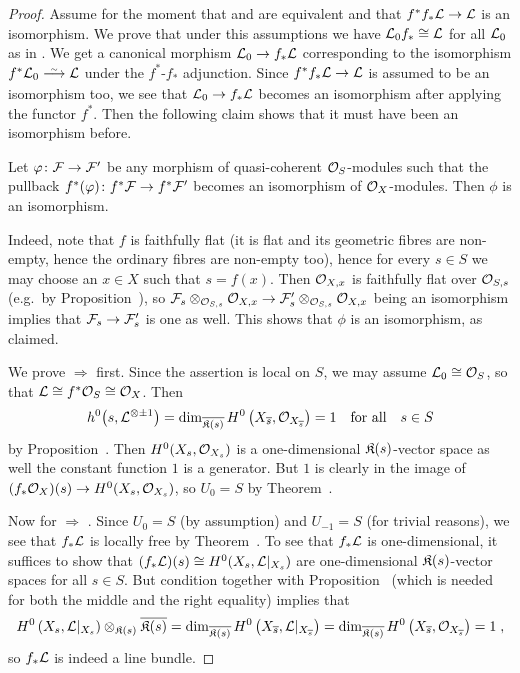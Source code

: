 \documentclass[a4paper,parskip=half,numbers=enddot, DIV=12]{scrreprt}
\begin{document}
\begin{proof}
	Assume for the moment that  and  are equivalent and that $f^*f_*\Ll\morphism \Ll$ is an isomorphism. We prove that under this assumptions we have $\mathcal{L}_0f_*\cong \mathcal{L}$ for all $\mathcal{L}_0$ as in . We get a canonical morphism $\Ll_0\morphism f_*\Ll$ corresponding to the isomorphism $f^*\Ll_0\isomorphism \Ll$ under the $f^*$-$f_*$ adjunction. Since $f^*f_*\Ll\morphism\Ll$ is assumed to be an isomorphism too, we see that $\Ll_0\morphism f_*\Ll$ becomes an isomorphism after applying the functor $f^*$. Then the following claim shows that it must have been an isomorphism before.
	\begin{claim}
		Let $\phi\colon \Ff\morphism\Ff'$ be any morphism of quasi-coherent $\mathcal{O}_S$-modules such that the pullback $f^*(\phi)\colon f^*\Ff\morphism  f^*\Ff'$ becomes an isomorphism of $\mathcal{O}_X$-modules. Then $\phi$ is an isomorphism.
	\end{claim}
	Indeed, note that $f$ is faithfully flat (it is flat and its geometric fibres are non-empty, hence the ordinary fibres are non-empty too), hence for every $s\in S$ we may choose an $x\in X$ such that $s=f(x)$. Then $\mathcal{O}_{X,x}$ is faithfully flat over $\mathcal{O}_{S,s}$ (e.g.\ by Proposition~), so $\Ff_s\otimes_{\Oo_{S,s}}\Oo_{X,x}\morphism\Ff'_s\otimes_{\Oo_{S,s}}\Oo_{X,x}$ being an isomorphism implies that $\Ff_s \morphism\Ff'_s$ is one as well. This shows that $\phi$ is an isomorphism, as claimed.
	
	We prove  $\Rightarrow$  first. Since the assertion is local on $S$, we may assume $\mathcal{L}_0\cong\mathcal{O}_S$, so that $\mathcal{L}\cong f^*\mathcal{O}_S\cong \mathcal{O}_X$. Then
	\begin{align*}
		h^0\big(s,\mathcal{L}^{\otimes \pm 1}\big)=\dim_{\overline{\mathfrak{K}(s)}}H^0\left(X_{\overline{s}},\mathcal{O}_{X_{\overline{s}}}\right)=1\quad\text{for all}\quad s\in S 
	\end{align*}
	by Proposition~. Then $H^0(X_s,\mathcal{O}_{X_s})$ is a one-dimensional $\mathfrak{K}(s)$-vector space as well the constant function $1$ is a generator. But $1$ is clearly in the image of $(f_*\Oo_X)(s)\morphism H^0(X_s,\Oo_{X_s})$, so $U_0=S$ by Theorem~.
	
	Now for  $\Rightarrow$ . Since $U_0=S$ (by assumption) and $U_{-1}=S$ (for trivial reasons), we see that $f_*\mathcal{L}$ is locally free by Theorem~. To see that $f_*\mathcal{L}$ is one-dimensional, it suffices to show that $(f_*\mathcal{L})(s)\cong H^0(X_s,\mathcal{L}|_{X_s})$ are one-dimensional $\mathfrak{K}(s)$-vector spaces for all $s\in S$. But condition  together with Proposition~ (which is needed for both the middle and the right equality) implies that 
	\begin{align*}
		H^0\left(X_s,\mathcal{L}|_{X_s}\right)\otimes_{\mathfrak{K}(s)}\overline{\mathfrak{K}(s)}= \dim_{\overline{\mathfrak{K}(s)}}H^0\left(X_{\overline{s}},\mathcal{L}|_{X_{\overline{s}}}\right)=\dim_{\overline{\mathfrak{K}(s)}}H^0\left(X_{\overline{s}},\mathcal{O}_{X_{\overline{s}}}\right)=1\;,
	\end{align*}
	so $f_*\mathcal{L}$ is indeed a line bundle. 
	

\end{proof}
\end{document}

